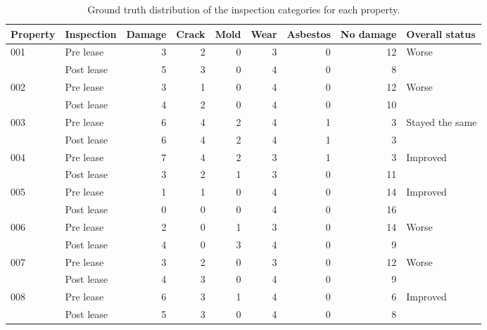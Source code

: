 \begin{table}[ht]
\centering
\caption{Ground truth distribution of the inspection categories for each property.}
\label{tab:property_ground_truth}
\begin{tabular}{llrrrrrrl}
\toprule
Property & Inspection & Damage & Crack & Mold & Wear & Asbestos & No damage & Overall status \\
\midrule

001 & Pre lease  & 3 & 2 & 0 & 3 & 0 & 12 & \multirow{2}{*}{Worse} \\
    & Post lease & 5 & 3 & 0 & 4 & 0 & 8 & \\
\midrule

002 & Pre lease  & 3 & 1 & 0 & 4 & 0 & 12 & \multirow{2}{*}{Worse} \\
    & Post lease & 4 & 2 & 0 & 4 & 0 & 10 & \\
\midrule

003 & Pre lease  & 6 & 4 & 2 & 4 & 1 & 3 & \multirow{2}{*}{Stayed the same} \\
    & Post lease & 6 & 4 & 2 & 4 & 1 & 3 & \\
\midrule

004 & Pre lease  & 7 & 4 & 2 & 3 & 1 & 3 & \multirow{2}{*}{Improved} \\
    & Post lease & 3 & 2 & 1 & 3 & 0 & 11 & \\
\midrule

005 & Pre lease  & 1 & 1 & 0 & 4 & 0 & 14 & \multirow{2}{*}{Improved} \\
    & Post lease & 0 & 0 & 0 & 4 & 0 & 16 & \\
\midrule

006 & Pre lease  & 2 & 0 & 1 & 3 & 0 & 14 & \multirow{2}{*}{Worse} \\
    & Post lease & 4 & 0 & 3 & 4 & 0 & 9 & \\
\midrule

007 & Pre lease  & 3 & 2 & 0 & 3 & 0 & 12 & \multirow{2}{*}{Worse} \\
    & Post lease & 4 & 3 & 0 & 4 & 0 & 9 & \\
\midrule

008 & Pre lease  & 6 & 3 & 1 & 4 & 0 & 6 & \multirow{2}{*}{Improved} \\
    & Post lease & 5 & 3 & 0 & 4 & 0 & 8 & \\

\bottomrule
\end{tabular}
\end{table}
